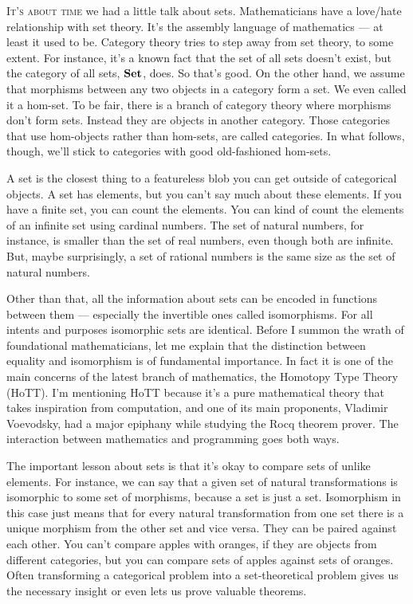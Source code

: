 
\lettrine[lhang=0.17]{I}{t's about time} we had a little talk about sets.
Mathematicians have a love/hate relationship with set theory. It's the
assembly language of mathematics --- at least it used to be. Category
theory tries to step away from set theory, to some extent. For instance,
it's a known fact that the set of all sets doesn't exist, but the category
of all sets, $\mathbf{Set}$, does. So that's good. On the other hand, we assume that
morphisms between any two objects in a category form a set. We even
called it a hom-set. To be fair, there is a branch of category theory
where morphisms don't form sets. Instead they are objects in another
category. Those categories that use hom-objects rather than hom-sets,
are called  categories. In what follows, though, we'll
stick to categories with good old-fashioned hom-sets.

A set is the closest thing to a featureless blob you can get outside of
categorical objects. A set has elements, but you can't say much about
these elements. If you have a finite set, you can count the elements.
You can kind of count the elements of an infinite set using cardinal
numbers. The set of natural numbers, for instance, is smaller than the
set of real numbers, even though both are infinite. But, maybe
surprisingly, a set of rational numbers is the same size as the set of
natural numbers.

Other than that, all the information about sets can be encoded in
functions between them --- especially the invertible ones called
isomorphisms. For all intents and purposes isomorphic sets are
identical. Before I summon the wrath of foundational mathematicians, let
me explain that the distinction between equality and isomorphism is of
fundamental importance. In fact it is one of the main concerns of the
latest branch of mathematics, the Homotopy Type Theory (HoTT). I'm
mentioning HoTT because it's a pure mathematical theory that takes
inspiration from computation, and one of its main proponents, Vladimir
Voevodsky, had a major epiphany while studying the Rocq theorem prover.
The interaction between mathematics and programming goes both ways.

The important lesson about sets is that it's okay to compare sets of
unlike elements. For instance, we can say that a given set of natural
transformations is isomorphic to some set of morphisms, because a set is
just a set. Isomorphism in this case just means that for every natural
transformation from one set there is a unique morphism from the other
set and vice versa. They can be paired against each other. You can't
compare apples with oranges, if they are objects from different
categories, but you can compare sets of apples against sets of oranges.
Often transforming a categorical problem into a set-theoretical problem
gives us the necessary insight or even lets us prove valuable theorems.

